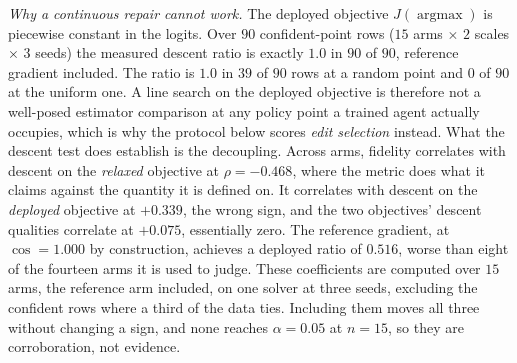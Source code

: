 \documentclass[journal]{IEEEtran}
\newcommand{\Jobj}{J}
\begin{document}
\emph{Why a continuous repair cannot work.}  The deployed objective
$\Jobj(\operatorname{argmax})$ is piecewise constant in the logits.  Over $90$
confident-point rows ($15$ arms $\times$ $2$ scales $\times$ $3$ seeds) the
measured descent ratio is exactly $1.0$ in $90$ of $90$, reference gradient
included.  The ratio is $1.0$ in $39$ of $90$ rows at a random point and $0$ of
$90$ at the uniform one.
A line search on the deployed objective is therefore
not a well-posed estimator comparison at any policy point a trained agent
actually occupies, which is why the protocol below scores \emph{edit selection}
instead.  What the descent test does establish is the decoupling.  Across arms,
fidelity correlates with descent on the \emph{relaxed} objective at
$\rho=-0.468$, where the metric does what it claims against the quantity it is
defined on.  It correlates with descent on the \emph{deployed} objective at
$+0.339$, the wrong sign, and the two objectives' descent qualities correlate at
$+0.075$, essentially zero.  The reference gradient, at $\cos=1.000$ by
construction, achieves a deployed ratio of $0.516$, worse than eight of the
fourteen arms it is used to judge.  These coefficients are computed over $15$
arms, the reference arm included, on one solver at three seeds, excluding the confident rows where a third of
the data ties. Including them moves all three without changing a sign, and none
reaches $\alpha=0.05$ at $n=15$, so they are corroboration, not evidence.
\end{document}
